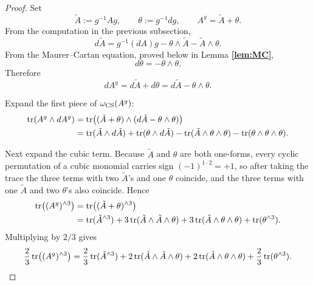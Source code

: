 \begin{proof}
Set
\begin{equation*}
\tilde A := g^{-1}Ag,
\qquad
\theta := g^{-1}dg,
\qquad
A^g = \tilde A + \theta.
\end{equation*}
From the computation in the previous subsection,
\begin{equation*}
d\tilde A = g^{-1}(dA)g - \theta\wedge\tilde A - \tilde A\wedge\theta.
\end{equation*}
From the Maurer--Cartan equation, proved below in Lemma \textbf{\ref{lem:MC}},
\begin{equation*}
d\theta = -\theta\wedge\theta.
\end{equation*}
Therefore
\begin{equation*}
dA^g = d\tilde A + d\theta = d\tilde A - \theta\wedge\theta.
\end{equation*}

\medskip

\noindent Expand the first piece of $\omega_{\operatorname{CS}}(A^g)$:
\begin{align*}
\operatorname{tr}(A^g\wedge dA^g)
&= \operatorname{tr}\bigl((\tilde A+\theta)\wedge(d\tilde A-\theta\wedge\theta)\bigr) \\
&= \operatorname{tr}(\tilde A\wedge d\tilde A)
 + \operatorname{tr}(\theta\wedge d\tilde A)
 - \operatorname{tr}(\tilde A\wedge\theta\wedge\theta)
 - \operatorname{tr}(\theta\wedge\theta\wedge\theta).
\end{align*}

\medskip

\noindent Next expand the cubic term. Because $\tilde A$ and $\theta$ are both one-forms, every cyclic permutation of a cubic monomial carries sign $(-1)^{1\cdot 2}=+1$, so after taking the trace the three terms with two $\tilde A$'s and one $\theta$ coincide, and the three terms with one $\tilde A$ and two $\theta$'s also coincide. Hence
\begin{align*}
\operatorname{tr}\bigl((A^g)^{\wedge 3}\bigr)
&= \operatorname{tr}\bigl((\tilde A+\theta)^{\wedge 3}\bigr) \\
&= \operatorname{tr}(\tilde A^{\wedge 3})
 + 3\operatorname{tr}(\tilde A\wedge\tilde A\wedge\theta)
 + 3\operatorname{tr}(\tilde A\wedge\theta\wedge\theta)
 + \operatorname{tr}(\theta^{\wedge 3}).
\end{align*}
Multiplying by $2/3$ gives
\begin{equation*}
\frac{2}{3}\operatorname{tr}\bigl((A^g)^{\wedge 3}\bigr)
= \frac{2}{3}\operatorname{tr}(\tilde A^{\wedge 3})
+ 2\operatorname{tr}(\tilde A\wedge\tilde A\wedge\theta)
+ 2\operatorname{tr}(\tilde A\wedge\theta\wedge\theta)
+ \frac{2}{3}\operatorname{tr}(\theta^{\wedge 3}).
\end{equation*}


\end{proof}
